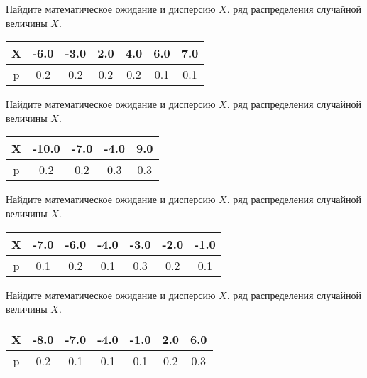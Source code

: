 \documentclass[a4paper,12pt]{article}
\begin{document}
    Найдите математическое ожидание и дисперсию $X$.
    \bigskip{}\medskip{} ряд распределения случайной величины $X$. 
    \begin{center} 
    \begin{tabular}{|c|c|c|c|c|c|c|}


\hline
X & -6.0 & -3.0 &  2.0 &  4.0 &  6.0 &  7.0 \\ \hline
p &  0.2 &  0.2 &  0.2 &  0.2 &  0.1 &  0.1 \\ \hline

\end{tabular}

    \end{center}
    Найдите математическое ожидание и дисперсию $X$.
    \bigskip{}\medskip{} ряд распределения случайной величины $X$. 
    \begin{center} 
    \begin{tabular}{|c|c|c|c|c|}


\hline
X & -10.0 & -7.0 & -4.0 &  9.0 \\ \hline
p &   0.2 &  0.2 &  0.3 &  0.3 \\ \hline

\end{tabular}

    \end{center}
    Найдите математическое ожидание и дисперсию $X$.
    \bigskip{}\medskip{} ряд распределения случайной величины $X$. 
    \begin{center} 
    \begin{tabular}{|c|c|c|c|c|c|c|}


\hline
X & -7.0 & -6.0 & -4.0 & -3.0 & -2.0 & -1.0 \\ \hline
p &  0.1 &  0.2 &  0.1 &  0.3 &  0.2 &  0.1 \\ \hline

\end{tabular}

    \end{center}
    Найдите математическое ожидание и дисперсию $X$.
    \bigskip{}\medskip{} ряд распределения случайной величины $X$. 
    \begin{center} 
    \begin{tabular}{|c|c|c|c|c|c|c|}


\hline
X & -8.0 & -7.0 & -4.0 & -1.0 &  2.0 &  6.0 \\ \hline
p &  0.2 &  0.1 &  0.1 &  0.1 &  0.2 &  0.3 \\ \hline

\end{tabular}

    \end{center}
\end{document}
